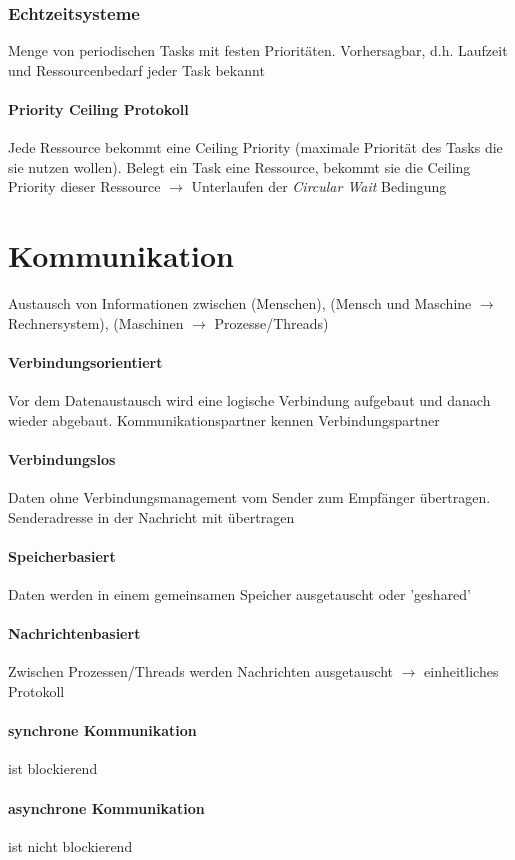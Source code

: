 \documentclass[10pt,a4paper,landscape]{article}
\begin{document}
\begin{multicols*}{3}
	\subsubsection{Echtzeitsysteme}
	Menge von periodischen Tasks mit festen Prioritäten. Vorhersagbar, d.h. Laufzeit und Ressourcenbedarf jeder Task bekannt
	\paragraph{Priority Ceiling Protokoll} Jede Ressource bekommt eine Ceiling Priority (maximale Priorität des Tasks die sie nutzen wollen). Belegt ein Task eine Ressource, bekommt sie die Ceiling Priority dieser Ressource $\rightarrow$ Unterlaufen der \textit{Circular Wait} Bedingung
	\section{Kommunikation}
	Austausch von Informationen zwischen (Menschen), (Mensch und Maschine $\rightarrow$ Rechnersystem), (Maschinen $\rightarrow$ Prozesse/Threads)
	\paragraph{Verbindungsorientiert} Vor dem Datenaustausch wird eine logische Verbindung aufgebaut und danach wieder abgebaut. Kommunikationspartner kennen Verbindungspartner
	\paragraph{Verbindungslos} Daten ohne Verbindungsmanagement vom Sender zum Empfänger übertragen. Senderadresse in der Nachricht mit übertragen
	\paragraph{Speicherbasiert} Daten werden in einem gemeinsamen Speicher ausgetauscht oder 'geshared'
	\paragraph{Nachrichtenbasiert} Zwischen Prozessen/Threads werden Nachrichten ausgetauscht $\rightarrow$ einheitliches Protokoll
	\paragraph{synchrone Kommunikation} ist blockierend
	\paragraph{asynchrone Kommunikation} ist nicht blockierend

\end{multicols*}
\end{document}
